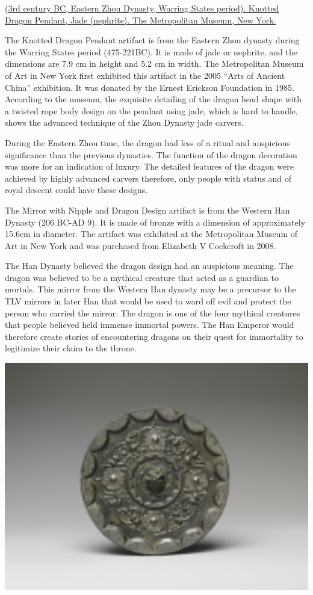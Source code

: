 \documentclass[
]{book}
\begin{document}
\href{https://www.metmuseum.org/art/collection/search/39637}{(3rd century BC, Eastern Zhou Dynasty, Warring States period). Knotted Dragon Pendant, Jade (nephrite). The Metropolitan Museum, New York.}

The Knotted Dragon Pendant artifact is from the Eastern Zhou dynasty during the Warring States period (475-221BC). It is made of jade or nephrite, and the dimensions are 7.9 cm in height and 5.2 cm in width. The Metropolitan Museum of Art in New York first exhibited this artifact in the 2005 ``Arts of Ancient China'' exhibition. It was donated by the Ernest Erickson Foundation in 1985. According to the museum, the exquisite detailing of the dragon head shape with a twisted rope body design on the pendant using jade, which is hard to handle, shows the advanced technique of the Zhou Dynasty jade carvers.

During the Eastern Zhou time, the dragon had less of a ritual and auspicious significance than the previous dynasties. The function of the dragon decoration was more for an indication of luxury. The detailed features of the dragon were achieved by highly advanced carvers therefore, only people with status and of royal descent could have these designs.

The Mirror with Nipple and Dragon Design artifact is from the Western Han Dynasty (206 BC-AD 9). It is made of bronze with a dimension of approximately 15.6cm in diameter. The artifact was exhibited at the Metropolitan Museum of Art in New York and was purchased from Elizabeth V Cockcroft in 2008.

The Han Dynasty believed the dragon design had an auspicious meaning. The dragon was believed to be a mythical creature that acted as a guardian to mortals. This mirror from the Western Han dynasty may be a precursor to the TLV mirrors in later Han that would be used to ward off evil and protect the person who carried the mirror. The dragon is one of the four mythical creatures that people believed held immense immortal powers. The Han Emperor would therefore create stories of encountering dragons on their quest for immortality to legitimize their claim to the throne.

\includegraphics[width=1\textwidth,height=\textheight]{images/Mirror_with_Nipple_and_Dragon_Design.png}
\end{document}
